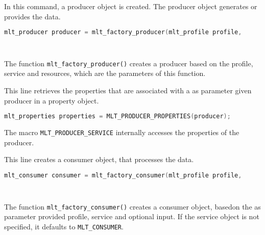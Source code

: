 \documentclass[../MasterThesis.tex]{subfiles}
\begin{document}
\begin{description}[font=\color{RedViolet!80!black}, style=nextline]
	In this command, a producer object is created. The producer object generates or provides the data.

	\begin{lstlisting}[language=C, numbers=none, columns=fullflexible, belowskip=0pt, aboveskip=9pt]
	mlt_producer producer = mlt_factory_producer(mlt_profile profile,
																							const char* service,
																							const void* resource); \end{lstlisting}
																						  
	The function \texttt{mlt\_factory\_producer()} creates a producer based on the profile, service and resources, which are the parameters of this function.


	
	
	\item[Create properties] 
	
	This line retrieves the properties that are associated with a as parameter given producer in a property object.
	
	\begin{lstlisting}[language=C, numbers=none, columns=fullflexible, belowskip=0pt, aboveskip=9pt]
	mlt_properties properties = MLT_PRODUCER_PROPERTIES(producer); \end{lstlisting}
	
	The macro \texttt{MLT\_PRODUCER\_SERVICE} internally accesses the properties of the producer.
	
	
	
	\item[Create a consumer] 
	
	This line creates a consumer object, that processes the data.
	
	\begin{lstlisting}[language=C, numbers=none, columns=fullflexible, belowskip=0pt, aboveskip=9pt]
	mlt_consumer consumer = mlt_factory_consumer(mlt_profile profile, 
																							const char* service, 
																							const void* input); \end{lstlisting}
																
	The function \texttt{mlt\_factory\_consumer()} creates a consumer object, basedon the as parameter provided profile, service and optional input. If the service object is not specified, it defaults to \texttt{MLT\_CONSUMER}.
											
																
	

\end{description}
\end{document}
